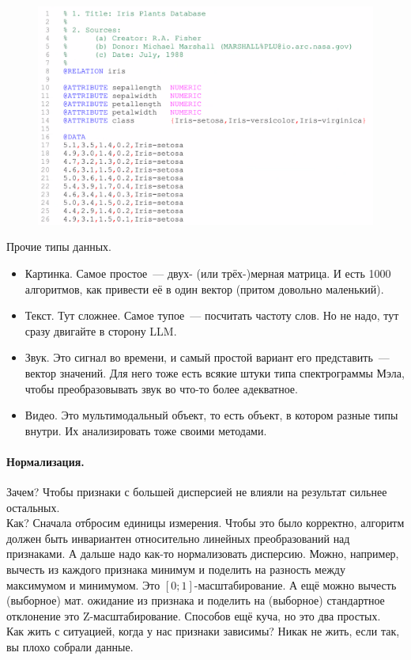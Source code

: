 \documentclass{article}
\begin{document}
    \begin{figure}[H]
        \centering
        \includegraphics[width=0.9\linewidth]{Images/ARFF-example}
        \label{fig:arff-example}
    \end{figure}\noindent
    Прочие типы данных.
    \begin{itemize}
        \item Картинка. Самое простое~--- двух- (или трёх-)мерная матрица. И есть 1000 алгоритмов, как привести её в один вектор (притом довольно маленький).
        \item Текст. Тут сложнее. Самое тупое~--- посчитать частоту слов. Но не надо, тут сразу двигайте в сторону LLM.
        \item Звук. Это сигнал во времени, и самый простой вариант его представить~--- вектор значений. Для него тоже есть всякие штуки типа спектрограммы Мэла, чтобы преобразовывать звук во что-то более адекватное.
        \item Видео. Это мультимодальный объект, то есть объект, в котором разные типы внутри. Их анализировать тоже своими методами.
    \end{itemize}
    \paragraph{Нормализация.} Зачем? Чтобы признаки с большей дисперсией не влияли на результат сильнее остальных.\\
    Как? Сначала отбросим единицы измерения. Чтобы это было корректно, алгоритм должен быть инвариантен относительно линейных преобразований над признаками. А дальше надо как-то нормализовать дисперсию. Можно, например, вычесть из каждого признака минимум и поделить на разность между максимумом и минимумом. Это $[0;1]$-масштабирование. А ещё можно вычесть (выборное) мат. ожидание из признака и поделить на (выборное) стандартное отклонение это Z-масштабирование. Способов ещё куча, но это два простых.\\
    Как жить с ситуацией, когда у нас признаки зависимы? Никак не жить, если так, вы плохо собрали данные.
\end{document}
